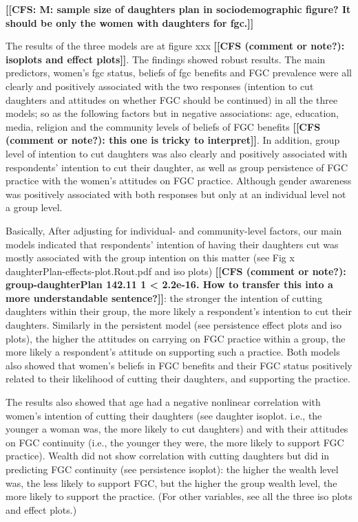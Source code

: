 \documentclass[12pt,]{article}
\newcommand{\comment}[1]{\textbf{[[#1]]}}
\newcommand{\cfcmt}[1]{\comment{CFS: #1}}
\newcommand{\cf}[1]{\comment{CFS (comment or note?): #1}}
\begin{document}
\cfcmt{M: sample size of daughters plan in sociodemographic figure?  It should be only the women with daughters for fgc.}

The results of the three models are at figure xxx \cf{isoplots and effect plots}.  The findings showed robust results.  The main predictors, women’s fgc status, beliefs of fgc benefits and FGC prevalence were all clearly and positively associated with the two responses (intention to cut daughters and attitudes on whether FGC should be continued) in all the three models; so as the following factors but in negative associations:  age, education, media, religion and the community levels of beliefs of FGC benefits \cf{this one is tricky to interpret}.  In addition, group level of intention to cut daughters was also clearly and positively associated with respondents’ intention to cut their daughter, as well as group persistence of FGC practice with the women’s attitudes on FGC practice.   Although gender awareness was positively associated with both responses but only at an individual level not a group level.

Basically, After adjusting for individual- and community-level factors, our main models indicated that respondents’ intention of having their daughters cut was mostly associated with the group intention on this matter (see Fig x daughterPlan-effects-plot.Rout.pdf and iso plots) \cf{group-daughterPlan  142.11  1  < 2.2e-16.  How to transfer this into a more understandable sentence?}:  the stronger the intention of cutting daughters within their group, the more likely a respondent’s intention to cut their daughters.  Similarly in the persistent model (see persistence effect plots and iso plots), the higher the attitudes on carrying on FGC practice within a group, the more likely a respondent’s attitude on supporting such a practice.  Both models also showed that women’s beliefs in FGC benefits and their FGC status positively related to their likelihood of cutting their daughters, and supporting the practice.

The results also showed that age had a negative nonlinear correlation with women’s intention of cutting their daughters (see daughter isoplot.  i.e., the younger a woman was, the more likely to cut daughters) and with their attitudes on FGC continuity (i.e., the younger they were,  the more likely to support FGC practice).  Wealth did not show correlation with cutting daughters but did in predicting FGC continuity (see persistence isoplot):  the higher the wealth level was, the less likely to support FGC, but the higher the group wealth level, the more likely to support the practice.  (For other variables, see all the three iso plots and effect plots.)
\end{document}
